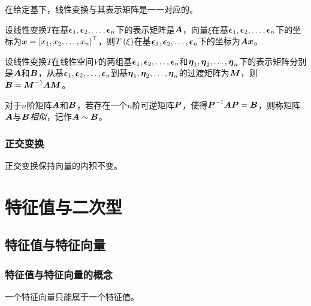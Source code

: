 \documentclass{ctexart}
\begin{document}
\begin{theorem}
    在给定基下，线性变换与其表示矩阵是一一对应的。
\end{theorem}

\begin{theorem}
    设线性变换\(T\)在基\(\enums{\veceps}{n}\)下的表示矩阵是\(\mata\)，向量\(\xi\)在基\(\enums{\veceps}{n}\)下的坐标为\(\vecx=\mat{\enums{x}{n}}^\top\)，则\(T\mypar{\xi}\)在基\(\enums{\veceps}{n}\)下的坐标为\(\mata\vecx\)。
\end{theorem}

\begin{theorem}
    设线性变换\(T\)在线性空间\(V\)的两组基\(\enums{\veceps}{n}\)和\(\enums{\veceta}{n}\)下的表示矩阵分别是\(\mata\)和\(\matb\)，从基\(\enums{\veceps}{n}\)到基\(\enums{\veceta}{n}\)的过渡矩阵为\(\matm\)，则\(\matb=\inv{\matm}\mata\matm\)。
\end{theorem}

\begin{definition}[相似]
    对于\(n\)阶矩阵\(\mata\)和\(\matb\)，若存在一个\(n\)阶可逆矩阵\(\matp\)，使得\(\inv{\matp}\mata\matp=\matb\)，则称矩阵\(\mata\)与\(\matb\)\emph{相似}，记作\(\mata\sim\matb\)。
\end{definition}

\subsubsection*{正交变换}

\begin{theorem}
    正交变换保持向量的内积不变。
\end{theorem}

\clearpage

\section{特征值与二次型}

\subsection{特征值与特征向量}

\subsubsection*{特征值与特征向量的概念}

\begin{theorem}
    一个特征向量只能属于一个特征值。
\end{theorem}
\end{document}
